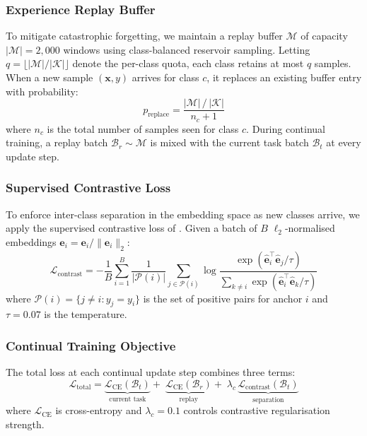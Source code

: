 \subsubsection{Experience Replay Buffer}

To mitigate catastrophic forgetting, we maintain a replay buffer
$\mathcal{M}$ of capacity $|\mathcal{M}| = 2{,}000$ windows using
class-balanced reservoir sampling. Letting $q = \lfloor |\mathcal{M}| / |\mathcal{K}| \rfloor$
denote the per-class quota, each class retains at most $q$ samples.
When a new sample $(\mathbf{x}, y)$ arrives for class $c$,
it replaces an existing buffer entry with probability:
\begin{equation}
    p_{\mathrm{replace}} =
    \frac{|\mathcal{M}|\,/\,|\mathcal{K}|}{n_c + 1}
    \label{eq:reservoir}
\end{equation}
where $n_c$ is the total number of samples seen for class $c$. During
continual training, a replay batch $\mathcal{B}_r \sim \mathcal{M}$ is
mixed with the current task batch $\mathcal{B}_t$ at every update step.

\subsubsection{Supervised Contrastive Loss}

To enforce inter-class separation in the embedding space as new classes
arrive, we apply the supervised contrastive loss of
\cite{khosla2020supervised}. Given a batch of $B$ $\ell_2$-normalised
embeddings $\hat{\mathbf{e}}_i = \mathbf{e}_i / \|\mathbf{e}_i\|_2$:
\begin{equation}
    \mathcal{L}_{\mathrm{contrast}} =
    -\frac{1}{B} \sum_{i=1}^{B}
    \frac{1}{|\mathcal{P}(i)|}
    \sum_{j \in \mathcal{P}(i)}
    \log
    \frac{\exp\!\left({\hat{\mathbf{e}}_i^{\top} \hat{\mathbf{e}}_j}/{\tau}\right)}
    {\displaystyle\sum_{k \neq i}
        \exp\!\left({\hat{\mathbf{e}}_i^{\top} \hat{\mathbf{e}}_k}/{\tau}\right)}
    \label{eq:contrastive}
\end{equation}
where $\mathcal{P}(i) = \{j \neq i : y_j = y_i\}$ is the set of positive
pairs for anchor $i$ and $\tau = 0.07$ is the temperature.

\subsubsection{Continual Training Objective}

The total loss at each continual update step combines three terms:
\begin{equation}
    \mathcal{L}_{\mathrm{total}} =
    \underbrace{\mathcal{L}_{\mathrm{CE}}(\mathcal{B}_t)}_{\text{current task}}
    +\;
    \underbrace{\mathcal{L}_{\mathrm{CE}}(\mathcal{B}_r)}_{\text{replay}}
    +\;
    \lambda_c\,
    \underbrace{\mathcal{L}_{\mathrm{contrast}}(\mathcal{B}_t)}_{\text{separation}}
    \label{eq:total_loss}
\end{equation}
where $\mathcal{L}_{\mathrm{CE}}$ is cross-entropy and
$\lambda_c = 0.1$ controls contrastive regularisation strength.

